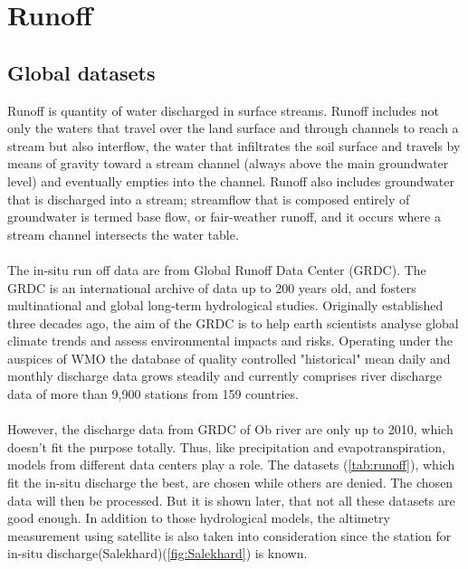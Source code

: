 \section{Runoff}\label{sec:runoff}
\subsection{Global datasets}
Runoff is quantity of water discharged in surface streams. Runoff includes not only the waters that travel over the land surface and through channels to reach a stream but also interflow, the water that infiltrates the soil surface and travels by means of gravity toward a stream channel (always above the main groundwater level) and eventually empties into the channel. Runoff also includes groundwater that is discharged into a stream; streamflow that is composed entirely of groundwater is termed base flow, or fair-weather runoff, and it occurs where a stream channel intersects the water table.\\\\
The in-situ run off data are from Global Runoff Data Center (GRDC). The GRDC is an international archive of data up to 200 years old, and fosters multinational and global long-term hydrological studies. Originally established three decades ago, the aim of the GRDC is to help earth scientists analyse global climate trends and assess environmental impacts and risks. Operating under the auspices of WMO the database of quality controlled "historical" mean daily and monthly discharge data grows steadily and currently comprises river discharge data of more than 9,900 stations from 159 countries.\\\\
However, the discharge data from GRDC of Ob river are only up to 2010, which doesn't fit the purpose totally. Thus, like precipitation and evapotranspiration, models from different data centers play a role. The datasets (\autoref{tab:runoff}), which fit the in-situ discharge the best, are chosen while others are denied. The chosen data will then be processed. But it is shown later, that not all these datasets are good enough. In addition to those hydrological models, the altimetry measurement using satellite is also taken into consideration since the station for in-situ discharge(Salekhard)(\autoref{fig:Salekhard}) is known. 
